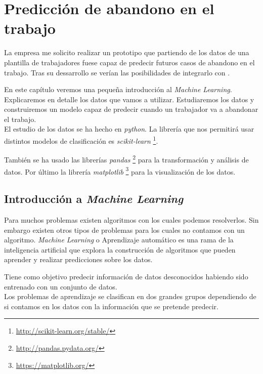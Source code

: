 \chapter{Predicción de abandono en el trabajo}

La empresa me solicito realizar un prototipo que partiendo de los datos de una plantilla de trabajadores fuese capaz de predecir futuros casos de abandono en el trabajo.
Tras su dessarrollo se verían las posibilidades de integrarlo con \wday{}.

En este capítulo veremos una pequeña introducción al \textit{Machine Learning}.
Explicaremos en detalle los datos que vamos a utilizar. Estudiaremos los datos y construiremos un modelo capaz de predecir cuando un trabajador va a abandonar el trabajo.\\



El estudio de los datos se ha hecho en \textit{python}. La librería que nos permitirá usar distintos modelos de clasificación es \textit{scikit-learn} \footnote{\url{http://scikit-learn.org/stable/}}.

También se ha usado las librerías \textit{pandas} \footnote{\url{http://pandas.pydata.org/}} para la transformación y análisis de datos. Por último la librería \textit{matplotlib} \footnote{\url{https://matplotlib.org/}} para la visualización de los datos.\\





\section{Introducción a \textit{Machine Learning}}

Para muchos problemas existen algoritmos con los cuales podemos resolverlos. Sin embargo existen otros tipos de problemas para los cuales no contamos con un algoritmo. 
\textit{Machine Learning} o Aprendizaje automático es una rama de la inteligencia artificial que explora la construcción de algoritmos que pueden aprender y realizar predicciones sobre los datos.



Tiene como objetivo predecir información de datos desconocidos habiendo sido entrenado con un conjunto de datos.\cite{scikit-learn,shalev-shwartz_ben-david_2016,alpaydin_2010}\\



Los problemas de aprendizaje se clasifican en dos grandes grupos dependiendo de si contamos en los datos con la información que se pretende predecir.

